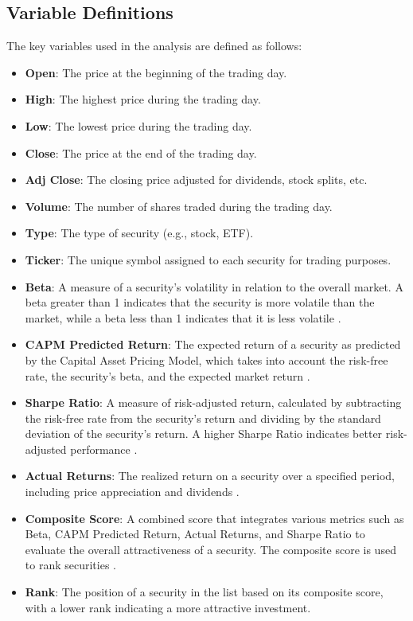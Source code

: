 \subsection{Variable Definitions}
The key variables used in the analysis are defined as follows:
\begin{itemize}
    \item \textbf{Open}: The price at the beginning of the trading day.
    \item \textbf{High}: The highest price during the trading day.
    \item \textbf{Low}: The lowest price during the trading day.
    \item \textbf{Close}: The price at the end of the trading day.
    \item \textbf{Adj Close}: The closing price adjusted for dividends, stock splits, etc.
    \item \textbf{Volume}: The number of shares traded during the trading day.
    \item \textbf{Type}: The type of security (e.g., stock, ETF).
    \item \textbf{Ticker}: The unique symbol assigned to each security for trading purposes.
    \item \textbf{Beta}: A measure of a security's volatility in relation to the overall market. A beta greater than 1 indicates that the security is more volatile than the market, while a beta less than 1 indicates that it is less volatile \citep{sharpe1966mutual}.
    \item \textbf{CAPM Predicted Return}: The expected return of a security as predicted by the Capital Asset Pricing Model, which takes into account the risk-free rate, the security's beta, and the expected market return \citep{markowitz1952portfolio}.
    \item \textbf{Sharpe Ratio}: A measure of risk-adjusted return, calculated by subtracting the risk-free rate from the security's return and dividing by the standard deviation of the security's return. A higher Sharpe Ratio indicates better risk-adjusted performance \citep{sharpe1966mutual}.
    \item \textbf{Actual Returns}: The realized return on a security over a specified period, including price appreciation and dividends \citep{fama1970efficient}.
    \item \textbf{Composite Score}: A combined score that integrates various metrics such as Beta, CAPM Predicted Return, Actual Returns, and Sharpe Ratio to evaluate the overall attractiveness of a security. The composite score is used to rank securities \citep{smith2020}.
    \item \textbf{Rank}: The position of a security in the list based on its composite score, with a lower rank indicating a more attractive investment.
\end{itemize}

\newpage
